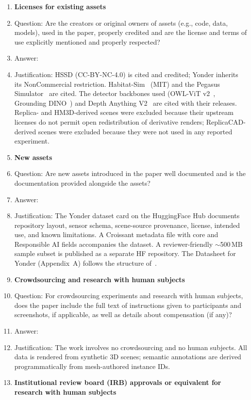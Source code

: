 \begin{enumerate}
\item {\bf Licenses for existing assets}
    \item[] Question: Are the creators or original owners of assets (e.g., code, data, models), used in the paper, properly credited and are the license and terms of use explicitly mentioned and properly respected?
    \item[] Answer: \answerYes{}
    \item[] Justification: HSSD (CC-BY-NC-4.0) is cited and credited; Yonder inherits its NonCommercial restriction. Habitat-Sim~\cite{savva2019habitat} (MIT) and the Pegasus Simulator~\cite{jacinto2024pegasus} are cited. The detector backbones used (OWL-ViT v2~\cite{minderer2023scaling}, Grounding DINO~\cite{liu2024grounding}) and Depth Anything V2~\cite{yang2024depth} are cited with their releases. Replica- and HM3D-derived scenes were excluded because their upstream licenses do not permit open redistribution of derivative renders; ReplicaCAD-derived scenes were excluded because they were not used in any reported experiment.
\item {\bf New assets}
    \item[] Question: Are new assets introduced in the paper well documented and is the documentation provided alongside the assets?
    \item[] Answer: \answerYes{}
    \item[] Justification: The Yonder dataset card on the HuggingFace Hub documents repository layout, sensor schema, scene-source provenance, license, intended use, and known limitations. A Croissant metadata file with core and Responsible AI fields accompanies the dataset. A reviewer-friendly $\sim$500\,MB sample subset is published as a separate HF repository. The Datasheet for Yonder (Appendix~A) follows the structure of~\cite{gebru2021datasheets}.
\item {\bf Crowdsourcing and research with human subjects}
    \item[] Question: For crowdsourcing experiments and research with human subjects, does the paper include the full text of instructions given to participants and screenshots, if applicable, as well as details about compensation (if any)?
    \item[] Answer: \answerNA{}
    \item[] Justification: The work involves no crowdsourcing and no human subjects. All data is rendered from synthetic 3D scenes; semantic annotations are derived programmatically from mesh-authored instance IDs.
\item {\bf Institutional review board (IRB) approvals or equivalent for research with human subjects}

\end{enumerate}
